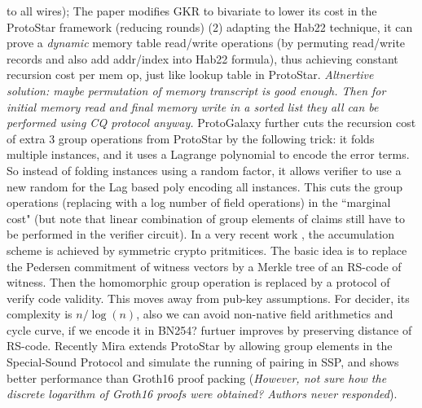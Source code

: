 to all wires); The paper modifies GKR to bivariate to lower
its cost in the ProtoStar framework (reducing rounds)
(2) adapting the Hab22 technique, it can prove
a {\em dynamic} memory table read/write operations (by permuting
read/write records and also add addr/index into Hab22 formula), thus
achieving constant recursion cost per mem op, just like
lookup table in ProtoStar. {\em Altnertive solution: maybe
permutation of memory transcript is good enough. Then for
initial memory read and final memory write in a sorted list they
all can be performed using CQ protocol anyway.}
ProtoGalaxy \cite{ProtoGalaxy} further cuts the recursion cost
of extra $3$ group operations from ProtoStar by the following trick:
it folds multiple instances, and it uses a Lagrange polynomial to encode
the error terms. So instead of folding instances using a random
factor, it allows verifier to use a new random for the Lag based poly
encoding all instances. This cuts the group operations (replacing
with a log number of field operations) in the ``marginal cost" (but
note that linear combination of group elements of claims still
have to be performed in the verifier circuit).
In a very recent work \cite{AccCode}, the accumulation scheme
is achieved by symmetric crypto pritmitices. The basic idea is
to replace the Pedersen commitment of witness vectors by a Merkle
tree of an RS-code of witness. Then the homomorphic group operation
is replaced by a protocol of verify code validity. This moves away
from pub-key assumptions. For decider, its complexity is $n/\log(n)$,
also we can avoid non-native field arithmetics and cycle curve,
if we encode it in BN254?
\cite{ARC} furtuer improves \cite{AccCode} by preserving distance
of RS-code.
Recently Mira \cite{Mira} extends ProtoStar by allowing
group elements in the Special-Sound Protocol and
simulate the running of pairing in SSP, and shows
better performance than Groth16 proof packing ({\em However,
not sure how the discrete logarithm of Groth16 proofs were
obtained? Authors never responded}).



